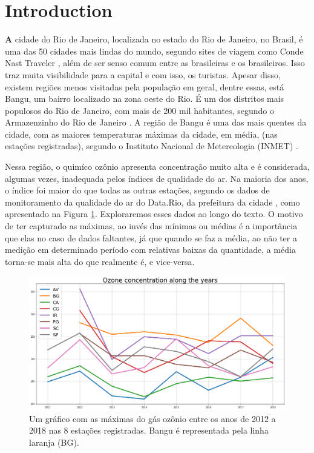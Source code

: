 \section{Introduction}

\lettrine[findent=2pt]{\textbf{A}}{} cidade do Rio de Janeiro, localizada no
estado do Rio de Janeiro, no Brasil, é uma das 50 cidades mais lindas do
mundo, segundo sites de viagem como Conde Nast Traveler \cite{travelRio}, além
de ser senso comum entre as brasileiras e os brasileiros. Isso traz muita
visibilidade para a capital e com isso, os turistas. Apesar disso, existem
regiões menos visitadas pela população em geral, dentre essas, está Bangu, um
bairro localizado na zona oeste do Rio. É um dos distritos mais populosos do
Rio de Janeiro, com mais de 200 mil habitantes, segundo o Armazenzinho do Rio
de Janeiro \cite{banguSecretaria}. A região de Bangu é uma das mais
quentes da cidade, com as maiores temperaturas máximas da cidade, em média,
(nas estações registradas), segundo o Instituto Nacional de Metereologia
(INMET) \cite{inmetBangu}. 

Nessa região, o quimíco ozônio apresenta concentração muito alta e é
considerada, algumas vezes, inadequada pelos índices de qualidade do ar. Na
maioria dos anos, o índice foi maior do que todas as outras estações, segundo
os dados de monitoramento da qualidade do ar do Data.Rio, da prefeitura da
cidade \cite{datasetAir}, como apresentado na Figura \ref{fig:graph1}.
Exploraremos esses dados ao longo do texto. O motivo de ter capturado as
máximas, ao invés das mínimas ou médias é a importância que elas no caso de
dados faltantes, já que quando se faz a média, ao não ter a medição em
determinado período com relativas baixas da quantidade, a média torna-se mais
alta do que realmente é, e vice-versa. 

\begin{figure}
    \includegraphics[width=\linewidth]{img/graphic1.png}
    \caption{Um gráfico com as máximas do gás ozônio entre os anos de 2012 a
    2018 nas 8 estações registradas. Bangu é representada pela linha laranja
    (BG).}
    \label{fig:graph1}
\end{figure}

